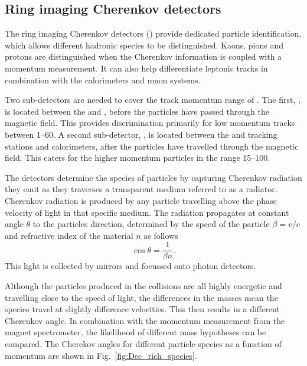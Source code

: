 

\subsection{Ring imaging Cherenkov detectors}
\label{sec:Dec_RICH}
The ring imaging Cherenkov detectors (\rich) provide dedicated particle identification, which allows different hadronic species to be distinguished.
Kaons, pions and protons are distinguished when the Cherenkov information is coupled with a momentum measurement. It can also help differentiate leptonic tracks in combination with the calorimeters and muon systems. 

Two \rich sub-detectors are needed to cover the track momentum range of \lhcb. The first, \richone, is located between the \velo and \ttracker, before the particles have passed through the magnetic field. This provides discrimination primarily for low momentum tracks between 1--60\gevc. A second sub-detector, \richtwo, is located between the \intr and \ot tracking stations and calorimeters, after the particles have travelled through the magnetic field. This caters for the higher momentum particles in the range 15--100\gevc. 

The \rich detectors determine the species of particles by capturing Cherenkov radiation they emit as they traverses a transparent medium referred to as a radiator. Cherenkov radiation is produced by any particle travelling above the phase velocity of light in that specific medium. The radiation propagates at constant angle $\theta$ to the particles direction, determined by the speed of the particle $\beta = v/c$ and refractive index of the material $n$ as follows
\begin{equation}
\cos{\theta} = \frac{1}{\beta n}.
\end{equation}
This light is collected by mirrors and focussed onto photon detectors. 

Although the particles produced in the collisions are all highly energetic and travelling close to the speed of light, the differences in the masses mean the species travel at slightly difference velocities. This then results in a different Cherenkov angle. In combination with the momentum measurement from the magnet spectrometer, the likelihood of different mass hypotheses can be compared. The Cherekov angles for different particle species as a function of momentum are shown in Fig.~\ref{fig:Dec_rich_species}. 


